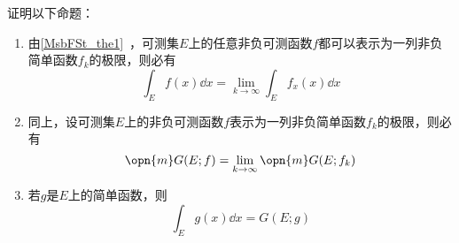\begin{exercise}{}
证明以下命题：

\begin{enumerate}
\item 由\autoref{MsbFSt_the1}~，可测集$E$上的任意非负可测函数$f$都可以表示为一列非负简单函数$f_k$的极限，则必有
\begin{equation}
\int_E f(x) \dd x = \lim\limits_{k\to\infty} \int_{E} f_x(x) \dd x
\end{equation}
\item 同上，设可测集$E$上的非负可测函数$f$表示为一列非负简单函数$f_k$的极限，则必有
\begin{equation}
\opn{m}G(E; f)=\lim\limits_{k\to \infty} \opn{m}G(E; f_k)
\end{equation}
\item 若$g$是$E$上的简单函数，则
\begin{equation}
\int_E g(x) \dd x = G(E; g)
\end{equation}
\end{enumerate}
\end{exercise}















